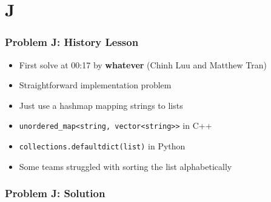 \section{J}%
\label{sec:j}

\begin{frame}
  \frametitle{Problem J: History Lesson}

  \begin{itemize}
    \item First solve at 00:17 by \textbf{whatever} (Chinh Luu and Matthew Tran)
    \item Straightforward implementation problem
    \item Just use a hashmap mapping strings to lists
    \item \texttt{unordered\_map<string, vector<string>>} in C++
    \item \texttt{collections.defaultdict(list)} in Python
    \item Some teams struggled with sorting the list alphabetically
  \end{itemize}
\end{frame}

\begin{frame}
  \frametitle{Problem J: Solution}
\end{frame}

